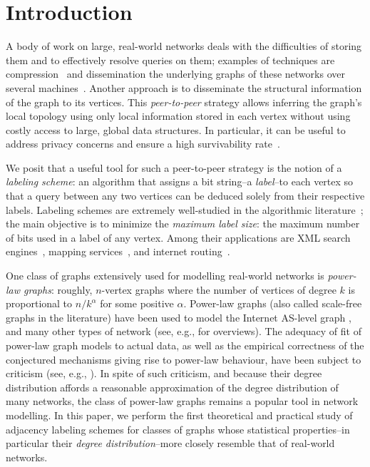 

\section{Introduction}
A body of work on large, real-world networks  deals with the difficulties of storing them and to effectively resolve queries on them; examples of techniques are
compression~\cite{boldi2004webgraph,boldi2011layered} and dissemination  the underlying graphs of these networks over several machines~\cite{gonzalez2012powergraph, stanton2012streaming, xie2014distributed}.
Another approach is to disseminate the structural information of the graph to its vertices. This \emph{peer-to-peer} strategy allows inferring the graph's local topology using only local information stored in each vertex without using costly access to large, global data structures.
In particular, it can be useful to address privacy concerns and ensure a high survivability rate~\cite{buchegger2009peerson}.

We posit that a useful tool for such a peer-to-peer strategy is the notion of a \emph{labeling scheme}: an algorithm that assigns a bit string--a \emph{label}--to each vertex so that a query between any two vertices can be deduced solely from their respective labels. 
Labeling schemes are extremely well-studied in the algorithmic literature~\cite{alstrup2014adjacency,brady2006compact,caminiti2008engineering,dahlgaard2014dynamic,gavoillea2004distance,gavoille2007shorter,katz2004labeling,korman2007general,korman2007compact,Korman07,rotbart2014evaluation}; the main objective is to minimize the \emph{maximum label size}: the maximum number of bits used in a label of any vertex. Among their applications are  XML search engines~\cite{cohen2010labeling}, mapping services~\cite{abraham2011hub}, and internet routing~\cite{krioukov2004compact}.

One class of graphs extensively used for modelling real-world networks is \emph{power-law graphs}: roughly, $n$-vertex graphs where the number of vertices of degree $k$ is proportional to $n/k^{\alpha}$ for some positive $\alpha$. Power-law graphs (also called scale-free graphs in the literature) have been used to model the Internet AS-level graph \cite{DBLP:journals/ton/SiganosFFF03,DBLP:conf/podc/AkellaCKS03}, and many other types of network (see, e.g., \cite{clauset2009power,mitzenmacher2004brief} for overviews). 
The adequacy of fit of power-law graph models to actual data, as well as the empirical correctness of the conjectured mechanisms giving rise to power-law behaviour, have been subject to criticism (see, e.g., \cite{DBLP:journals/jacm/AchlioptasCKM09,clauset2009power}).
 In spite of such criticism, and because their degree distribution affords a reasonable approximation of the degree distribution of many networks, the class of power-law graphs remains a popular tool in network modelling.
In this paper, we perform the first theoretical and practical study of adjacency labeling schemes for classes of graphs whose statistical properties--in particular their \emph{degree distribution}--more closely resemble that of real-world networks.


